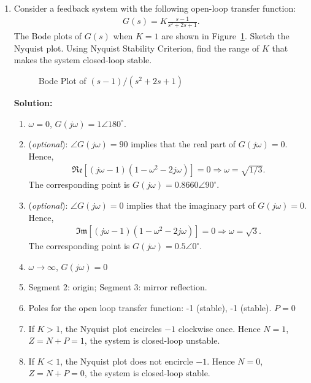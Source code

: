 \documentclass{article}
\newlength\figureheight
\newlength\figurewidth
\newcommand{\tikzdir}[1]{tikz/#1.tikz}
\newcommand{\inputtikz}[1]{}}
\begin{document}
\begin{enumerate}
  \newpage
\item Consider a feedback system with the following open-loop transfer function:
  \begin{align*}
    G(s) = K\frac{s-1}{s^2+2s+1}.
  \end{align*}
  The Bode plots of $G(s)$ when $K = 1$ are shown in Figure~\ref{fig:2}. Sketch the Nyquist plot. Using Nyquist Stability Criterion, find the range of $K$ that makes the system closed-loop stable.
  \begin{figure}[ht]
    \setlength\figureheight{5cm}
    \setlength\figurewidth{14cm}
    \centering
    \inputtikz{Quiz24}
    \caption{Bode Plot of $(s-1)/(s^2+2s+1)$\label{fig:2}}
  \end{figure}
  {\bf Solution:}
  \begin{enumerate}

  \item $\omega = 0$, $G(j\omega) = 1\angle 180^\circ$.
  \item ({\it optional}): $\angle G(j\omega) = 90$ implies that the real part of $G(j\omega) = 0$. Hence,
    \begin{align*}
      \mathfrak{Re}\left[(j\omega - 1)(1-\omega^2 -2j\omega)\right] = 0 \Rightarrow \omega = \sqrt{1/3}.
    \end{align*}
    The corresponding point is $G(j\omega) = 0.8660\angle 90^\circ$.
  \item ({\it optional}): $\angle G(j\omega) = 0$ implies that the imaginary part of $G(j\omega) = 0$. Hence,
    \begin{align*}
      \mathfrak{Im}\left[(j\omega - 1)(1-\omega^2 -2j\omega)\right] = 0 \Rightarrow \omega = \sqrt{3}.
    \end{align*}
    The corresponding point is $G(j\omega) = 0.5\angle 0^\circ$.
  \item $\omega\rightarrow \infty$, $G(j\omega) = 0$
  \item Segment 2: origin; Segment 3: mirror reflection.

  \item Poles for the open loop transfer function: -1 (stable), -1 (stable). $P=0$
  \item  If $K > 1$, the Nyquist plot encircles $-1$ clockwise once. Hence $N = 1$, $Z = N+P = 1$, the system is closed-loop unstable.
  \item  If $K < 1$, the Nyquist plot does not encircle $-1$. Hence $N = 0$, $Z = N+P = 0$, the system is closed-loop stable.
  \end{enumerate}



\end{enumerate}
\end{document}
